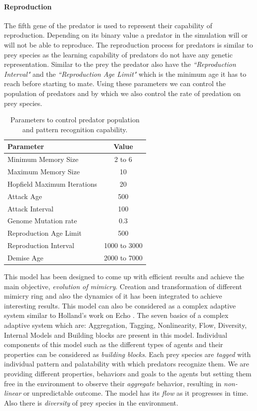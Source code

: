 \documentclass[letterpaper]{article}
\numberwithin{equation}{section}
\begin{document}
\paragraph{Reproduction}
The  fifth gene of the predator is used to represent their capability of reproduction.  Depending on its binary value a predator in the simulation will or will not be able to reproduce. The reproduction process for predators is similar to prey species as the learning capability of predators do not have any genetic representation. Similar to the prey the predator also have the \textsl{``Reproduction Interval"} and the \textsl{``Reproduction Age Limit"} which is the minimum age it has to reach before starting to mate. Using these parameters we can control the population of predators and by which we also control the rate of predation on prey species.

\begin{table}[h]
\small
\centering
\begin{tabular}{| l | c |}
	\hline
		\textbf{Parameter} & \textbf{Value} \\ \hline
		Minimum Memory Size & 2 to 6 \\ \hline
		Maximum Memory Size & 10 \\ \hline 
		Hopfield Maximum Iterations & 20 \\ \hline
		Attack Age & 500 \\ \hline
		Attack Interval & 100 \\ \hline
		Genome Mutation rate & 0.3 \\ \hline
		Reproduction Age Limit & 500 \\ \hline
		Reproduction Interval & 1000 to 3000 \\ \hline
		Demise Age & 2000 to 7000 \\
	\hline
\end{tabular}
\caption{Parameters to control predator population and pattern recognition capability.}
\label{tab:predator-control-parameters}
\end{table}

This model has been designed to come up with efficient results and achieve the main objective, \textit{evolution of mimicry}. Creation and transformation of different mimicry ring and also the dynamics of it has been integrated to achieve interesting results. This model can also be considered as a complex adaptive system similar to Holland's work on Echo \citep{holland1996}. The seven basics of a complex adaptive system which are: Aggregation, Tagging, Nonlinearity, Flow, Diversity, Internal Models and Building blocks \citep{holland1996} are present in this model. Individual components of this model such as the different types of agents and their properties can be considered as \textit{building blocks}. Each prey species are \textit{tagged} with individual pattern and palatability with which predators recognize them. We are providing different properties, behaviors and goals to the agents but setting them free in the environment to observe their \textit{aggregate} behavior, resulting in \textit{non-linear} or unpredictable outcome. The model has its \textit{flow} as it progresses in time. Also there is \textit{diversity} of prey species in the environment.
\end{document}

